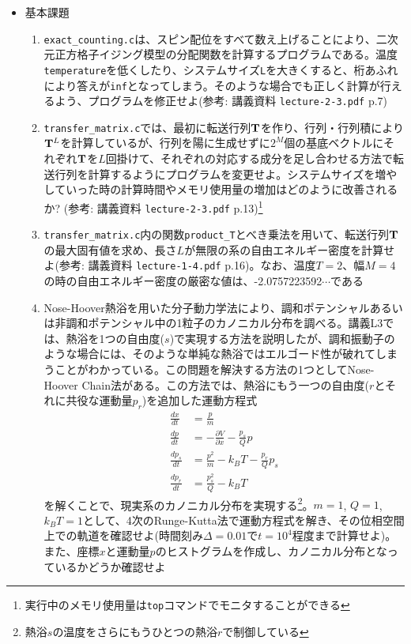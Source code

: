 \documentclass{jarticle}
\begin{document}
\begin{itemize}
\item 基本課題
  \begin{enumerate}
  \item {\tt exact\_counting.c}は、スピン配位をすべて数え上げることにより、二次元正方格子イジング模型の分配関数を計算するプログラムである。温度{\tt temperature}を低くしたり、システムサイズ{\tt L}を大きくすると、桁あふれにより答えが{\tt inf}となってしまう。そのような場合でも正しく計算が行えるよう、プログラムを修正せよ(参考: 講義資料 {\tt lecture-2-3.pdf} p.7)
\item {\tt transfer\_matrix.c}では、最初に転送行列${\bf T}$を作り、行列・行列積により${\bf T}^L$を計算しているが、行列を陽に生成せずに$2^M$個の基底ベクトルにそれぞれ${\bf T}$を$L$回掛けて、それぞれの対応する成分を足し合わせる方法で転送行列を計算するようにプログラムを変更せよ。システムサイズを増やしていった時の計算時間やメモリ使用量の増加はどのように改善されるか? (参考: 講義資料 {\tt lecture-2-3.pdf} p.13)\footnote{実行中のメモリ使用量は{\tt top}コマンドでモニタすることができる}
\item {\tt transfer\_matrix.c}内の関数{\tt product\_T}とべき乗法を用いて、転送行列${\bf T}$の最大固有値を求め、長さ$L$が無限の系の自由エネルギー密度を計算せよ(参考: 講義資料 {\tt lecture-1-4.pdf} p.16)。なお、温度$T=2$、幅$M=4$の時の自由エネルギー密度の厳密な値は、-2.0757223592$\cdots$である
\item Nose-Hoover熱浴を用いた分子動力学法により、調和ポテンシャルあるいは非調和ポテンシャル中の1粒子のカノニカル分布を調べる。講義L3では、熱浴を1つの自由度($s$)で実現する方法を説明したが、調和振動子のような場合には、そのような単純な熱浴ではエルゴード性が破れてしまうことがわかっている。この問題を解決する方法の1つとしてNose-Hoover Chain法がある。この方法では、熱浴にもう一つの自由度($r$とそれに共役な運動量$p_r$)を追加した運動方程式
  \begin{align*}
    \frac{dx}{dt} &= \frac{p}{m} \\
    \frac{dp}{dt} &= -\frac{\partial V}{\partial x} - \frac{p_s}{Q} p \\
    \frac{dp_s}{dt} &= \frac{p^2}{m} - k_B T - \frac{p_r}{Q} p_s \\
    \frac{dp_r}{dt} &= \frac{p_s^2}{Q} - k_B T
  \end{align*}
  を解くことで、現実系のカノニカル分布を実現する\footnote{熱浴$s$の温度をさらにもうひとつの熱浴$r$で制御している}。$m=1$, $Q=1$, $k_BT=1$として、4次のRunge-Kutta法で運動方程式を解き、その位相空間上での軌道を確認せよ(時間刻み$\Delta=0.01$で$t=10^4$程度まで計算せよ)。また、座標$x$と運動量$p$のヒストグラムを作成し、カノニカル分布となっているかどうか確認せよ

\end{enumerate}
\end{itemize}
\end{document}
